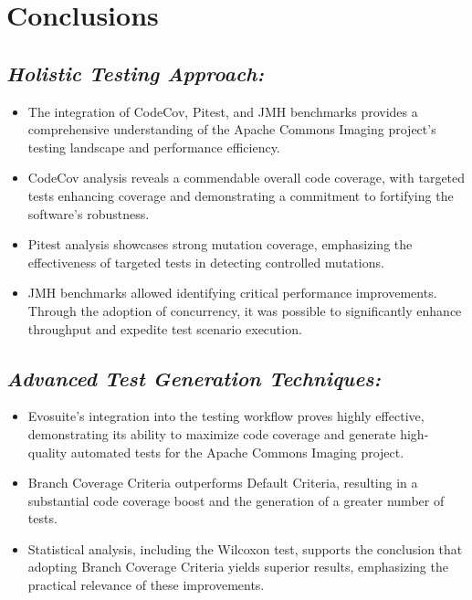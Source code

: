 \documentclass[sigconf]{acmart}
\begin{document}
\section{Conclusions}

\subsection{\textbf{\textit{Holistic Testing Approach:}}}
   \begin{itemize}
       \item The integration of CodeCov, Pitest, and JMH benchmarks provides a comprehensive understanding of the Apache Commons Imaging project's testing landscape and performance efficiency.
       \item CodeCov analysis reveals a commendable overall code coverage, with targeted tests enhancing coverage and demonstrating a commitment to fortifying the software's robustness.
       \item Pitest analysis showcases strong mutation coverage, emphasizing the effectiveness of targeted tests in detecting controlled mutations.
       \item JMH benchmarks allowed identifying critical performance improvements. Through the adoption of concurrency, it was possible to significantly enhance throughput and expedite test scenario execution.
   \end{itemize}

\subsection{\textbf{\textit{Advanced Test Generation Techniques:}}}
   \begin{itemize}
       \item Evosuite's integration into the testing workflow proves highly effective, demonstrating its ability to maximize code coverage and generate high-quality automated tests for the Apache Commons Imaging project.
       \item Branch Coverage Criteria outperforms Default Criteria, resulting in a substantial code coverage boost and the generation of a greater number of tests.
       \item Statistical analysis, including the Wilcoxon test, supports the conclusion that adopting Branch Coverage Criteria yields superior results, emphasizing the practical relevance of these improvements.
   \end{itemize}
\end{document}
